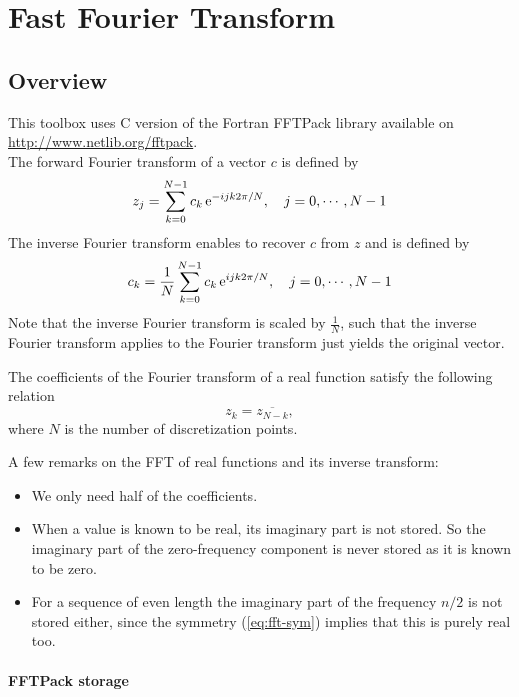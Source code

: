 \section{Fast Fourier Transform}
\subsection{Overview}

This toolbox uses C version of the Fortran FFTPack library available on \url{http://www.netlib.org/fftpack}. \\


The forward Fourier transform of a vector $c$ is defined by
\begin{equation*}
  z_j = \sum_{k=0}^{N-1} c_k \operatorname{e}^{ -i j k 2 \pi / N }, \quad j=0,\cdots,N-1
\end{equation*}
The inverse Fourier transform enables to recover $c$ from $z$ and is defined by
\begin{equation*}
  c_k = \frac{1}{N}\sum_{k=0}^{N-1} c_k \operatorname{e}^{ i j k 2 \pi / N }, \quad j=0,\cdots,N-1
\end{equation*}
Note that the inverse Fourier transform is scaled by $\frac{1}{N}$, such that the inverse Fourier transform applies to the Fourier transform just yields the original vector.


The coefficients of the Fourier transform of a real function satisfy the
following relation
\begin{equation}
  \label{eq:fft-sym}
  z_k = \overline{z_{N-k}},
\end{equation}
where $N$ is the number of discretization points.

A few remarks on the FFT of real functions and its inverse transform:
\begin{itemize}
\item We only need half of the coefficients.
\item When a value is known to be real, its imaginary part is not stored.
  So the imaginary part of the zero-frequency component is never stored as it is
  known to be zero.
\item For a sequence of even length the imaginary part of the frequency
  $n/2$ is not stored either, since the symmetry (\ref{eq:fft-sym}) implies
  that this is purely real too.
\end{itemize}


\paragraph{FFTPack storage}
\label{sec:fftpack-storage}

